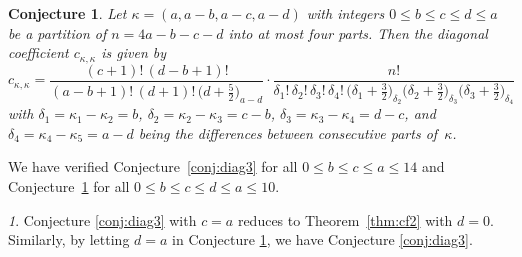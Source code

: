 \documentclass{mathincs}
\numberwithin{equation}{section}
\numberwithin{figure}{section}
\theoremstyle{plain}
\theoremstyle{definition}
\theoremstyle{remark}
\newtheorem{rem}[thm]{\protect\remarkname}
\theoremstyle{plain}
\theoremstyle{definition}
\theoremstyle{plain}
\theoremstyle{plain}
\newtheorem{conj}[thm]{Conjecture}
\providecommand{\remarkname}{Remark}
\begin{document}
\begin{conj}\label{conj:diag4}
  Let $\kappa=(a,a-b,a-c,a-d)$ with integers $0\leq b\leq c\leq d\leq a$ be a
  partition of $n=4a-b-c-d$ into at most four parts. Then the diagonal
  coefficient $c_{\kappa,\kappa}$ is given by
 \[ 
c_{\kappa,\kappa}=\frac{(c+1)! \, (d-b+1)!}{(a-b+1)! \, (d+1)! \,  \bigl(d+\frac52\bigr)_{\!a-d}}
    \cdot \frac{n!}{\delta_1! \, \delta_2! \, \delta_3! \, \delta_4! \,
      \bigl(\delta_1+\frac32\bigr)_{\!\delta_2} \bigl(\delta_2+\frac32\bigr)_{\!\delta_3} \bigl(\delta_3+\frac32\bigr)_{\!\delta_4}}  
\]  
  with $\delta_1=\kappa_1-\kappa_2=b$, $\delta_2=\kappa_2-\kappa_3=c-b$,
  $\delta_3=\kappa_3-\kappa_4=d-c$, and $\delta_4=\kappa_4-\kappa_5=a-d$ being
  the differences between consecutive parts of~$\kappa$.
\end{conj}

We have verified Conjecture~\ref{conj:diag3} for all $0\leq b\leq c\leq a\leq
14$ and Conjecture~\ref{conj:diag4} for all $0\leq b\leq c\leq d\leq a\leq
10$.

\begin{rem}
Conjecture \ref{conj:diag3} with $c=a$ reduces to  Theorem~\ref{thm:cf2}  with $d=0$. Similarly, by letting $d=a$ in
Conjecture \ref{conj:diag4}, we have Conjecture \ref{conj:diag3}. 
\end{rem}
\end{document}
